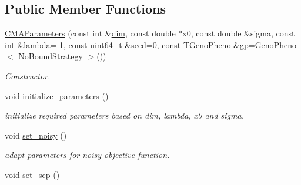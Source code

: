 \subsection*{Public Member Functions}
\begin{DoxyCompactItemize}
\item 
\hyperlink{classlibcmaes_1_1CMAParameters_a18d6039c0adffddd51caee1250b072bc}{C\-M\-A\-Parameters} (const int \&\hyperlink{classlibcmaes_1_1Parameters_a95a3c04400a77d134bb1e9705189a24e}{dim}, const double $\ast$x0, const double \&sigma, const int \&\hyperlink{classlibcmaes_1_1Parameters_a3d569987e9a5eb61bc781ee75b2ab18a}{lambda}=-\/1, const uint64\-\_\-t \&seed=0, const T\-Geno\-Pheno \&gp=\hyperlink{classlibcmaes_1_1GenoPheno}{Geno\-Pheno}$<$ \hyperlink{classlibcmaes_1_1NoBoundStrategy}{No\-Bound\-Strategy} $>$())
\begin{DoxyCompactList}\small\item\em Constructor. \end{DoxyCompactList}\item 
\hypertarget{classlibcmaes_1_1CMAParameters_a0d963d4719d9b6447cddeeca542167a1}{void \hyperlink{classlibcmaes_1_1CMAParameters_a0d963d4719d9b6447cddeeca542167a1}{initialize\-\_\-parameters} ()}\label{classlibcmaes_1_1CMAParameters_a0d963d4719d9b6447cddeeca542167a1}

\begin{DoxyCompactList}\small\item\em initialize required parameters based on dim, lambda, x0 and sigma. \end{DoxyCompactList}\item 
\hypertarget{classlibcmaes_1_1CMAParameters_aa6dc1bafcff83e082db9146a923949d3}{void \hyperlink{classlibcmaes_1_1CMAParameters_aa6dc1bafcff83e082db9146a923949d3}{set\-\_\-noisy} ()}\label{classlibcmaes_1_1CMAParameters_aa6dc1bafcff83e082db9146a923949d3}

\begin{DoxyCompactList}\small\item\em adapt parameters for noisy objective function. \end{DoxyCompactList}\item 
\hypertarget{classlibcmaes_1_1CMAParameters_a1f2115c14728278a946c358d8d26f30c}{void \hyperlink{classlibcmaes_1_1CMAParameters_a1f2115c14728278a946c358d8d26f30c}{set\-\_\-sep} ()}\label{classlibcmaes_1_1CMAParameters_a1f2115c14728278a946c358d8d26f30c}


\end{DoxyCompactItemize}
